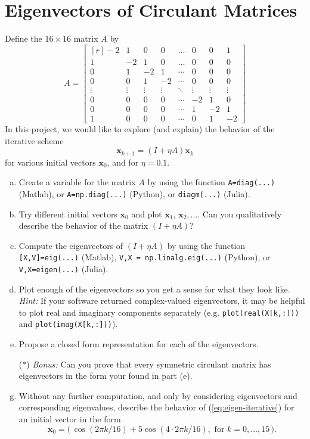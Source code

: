 \section{Eigenvectors of Circulant Matrices}


Define the $16 \times 16$ matrix $A$ by
\begin{equation}
A = \begin{bmatrix*}[r] -2 & 1 & 0 & 0 & \dots & 0 & 0 & 1 \\ 1 & -2 & 1 & 0 & \dots& 0 & 0 & 0 \\ 0 & 1 & -2 & 1 & \cdots&0 & 0 & 0 \\ 0 & 0 & 1 & -2 & \cdots&0 & 0 & 0 \\ \vdots & \vdots & \vdots & \vdots & \ddots & \vdots & \vdots & \vdots \\ 0 & 0 & 0 & 0 & \cdots & -2 & 1 & 0 \\ 0 & 0 & 0 & 0 & \cdots & 1 & -2 & 1\\ 1 & 0 & 0 & 0 & \cdots & 0 & 1 & -2 \end{bmatrix*}
\end{equation}
In this project, we would like to explore (and explain) the behavior of the iterative scheme
    \begin{equation}
      \label{eq:eigen-iterative}
      \bm{x}_{k+1} = \left(I + \eta A\right) \bm{x}_{k}
    \end{equation}
   for various initial vectors $\bm{x}_0$, and for $\eta = 0.1$. 
\begin{enumerate}[(a)]
  \item Create a variable for the matrix $A$ by using the function \texttt{A=diag(...)} (Matlab), or \texttt{A=np.diag(...)} (Python), or \texttt{diagm(...)} (Julia).
  \item Try different initial vectors $\bm{x}_0$ and plot $\bm{x}_1$, $\bm{x}_2, \dots $. Can you qualitatively describe the behavior of the matrix $(I + \eta A)$? 
  \item Compute the eigenvectors of $(I+\eta A)$ by using the function \texttt{[X,V]=eig(...)} (Matlab), \texttt{V,X = np.linalg.eig(...)} (Python), or \texttt{V,X=eigen(...)} (Julia).
  \item \sloppy Plot enough of the eigenvectors so you get a sense for what they look like.\\ \textit{Hint:} If your software returned complex-valued eigenvectors, it may be helpful to plot real and imaginary components separately (e.g. \texttt{plot(real(X[k,:]))} and \texttt{plot(imag(X[k,:]))}). 
  \item Propose a closed form representation for each of the eigenvectors.
  \item[($\ast$)] \textit{Bonus:} Can you prove that every symmetric circulant matrix has eigenvectors in the form your found in part (e).
  \item Without any further computation, and only by considering eigenvectors and corresponding eigenvalues, describe the behavior of (\ref{eq:eigen-iterative}) for an initial vector in the form
\begin{equation*}
\bm{x}_0 = \big(\, \cos(2\pi k / 16) + 5 \cos( 4 \cdot 2\pi k / 16), \text{ for } k = 0,...,15\,\big).
\end{equation*}
\end{enumerate}
